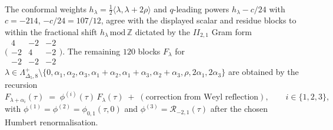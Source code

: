 \begin{theorem}
\begin{align}
 \label{eq:modbootstrap-explicit-F2a3}
\end{align}
The conformal weights $h_\lambda =
\tfrac{1}{2}\langle\lambda,\lambda + 2\rho\rangle$ and
$q$-leading powers $h_\lambda - c/24$ with $c = -214$,
$-c/24 = 107/12$, agree with the displayed scalar and residue blocks
to within the fractional shift $h_\lambda\,\mathrm{mod}\,\mathbb Z$
dictated by the $II_{2,1}$ Gram form
$\bigl(\begin{smallmatrix}4 & -2 & -2\\-2 & 4 & -2\\
-2 & -2 & -2\end{smallmatrix}\bigr)$.
The remaining $120$ blocks $F_\lambda$ for
$\lambda\in\Lambda^{+}_{\Delta_5, 8}\setminus
\{0,\alpha_1,\alpha_2,\alpha_3,\alpha_1+\alpha_2,
\alpha_1+\alpha_3,\alpha_2+\alpha_3,\rho,2\alpha_1,2\alpha_3\}$
are obtained by the recursion
\[
 F_{\lambda + \alpha_i}(\tau)
 \;=\;
 \phi^{(i)}(\tau)\,F_\lambda(\tau)
 \;+\;
 (\text{correction from Weyl reflection}),
 \qquad
 i\in\{1, 2, 3\},
\]
with $\phi^{(1)} = \phi^{(2)} = \phi_{0,1}(\tau,0)$ and
$\phi^{(3)} = \mathcal R_{-2,1}(\tau)$ after the chosen Humbert
renormalisation.
\end{theorem}

